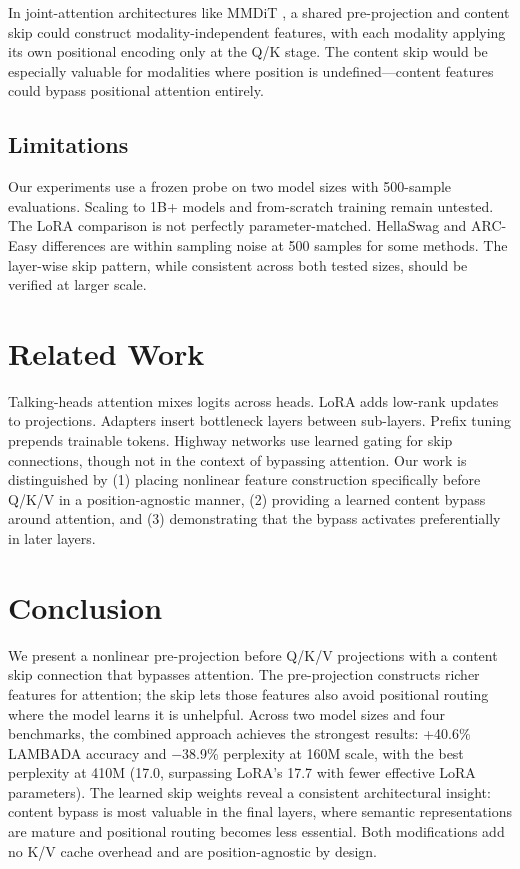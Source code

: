 \documentclass[11pt]{article}
\begin{document}
In joint-attention architectures like MMDiT \citep{esser2024scaling}, a shared pre-projection and content skip could construct modality-independent features, with each modality applying its own positional encoding only at the Q/K stage. The content skip would be especially valuable for modalities where position is undefined---content features could bypass positional attention entirely.

\subsection{Limitations}

Our experiments use a frozen probe on two model sizes with 500-sample evaluations. Scaling to 1B+ models and from-scratch training remain untested. The LoRA comparison is not perfectly parameter-matched. HellaSwag and ARC-Easy differences are within sampling noise at 500 samples for some methods. The layer-wise skip pattern, while consistent across both tested sizes, should be verified at larger scale.

\section{Related Work}

Talking-heads attention \citep{shazeer2020talking} mixes logits across heads. LoRA \citep{hu2021lora} adds low-rank updates to projections. Adapters \citep{houlsby2019parameter} insert bottleneck layers between sub-layers. Prefix tuning \citep{li2021prefix} prepends trainable tokens. Highway networks \citep{srivastava2015highway} use learned gating for skip connections, though not in the context of bypassing attention. Our work is distinguished by (1) placing nonlinear feature construction specifically before Q/K/V in a position-agnostic manner, (2) providing a learned content bypass around attention, and (3) demonstrating that the bypass activates preferentially in later layers.

\section{Conclusion}

We present a nonlinear pre-projection before Q/K/V projections with a content skip connection that bypasses attention. The pre-projection constructs richer features for attention; the skip lets those features also avoid positional routing where the model learns it is unhelpful. Across two model sizes and four benchmarks, the combined approach achieves the strongest results: +40.6\% LAMBADA accuracy and $-$38.9\% perplexity at 160M scale, with the best perplexity at 410M (17.0, surpassing LoRA's 17.7 with fewer effective LoRA parameters). The learned skip weights reveal a consistent architectural insight: content bypass is most valuable in the final layers, where semantic representations are mature and positional routing becomes less essential. Both modifications add no K/V cache overhead and are position-agnostic by design.
\end{document}
